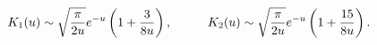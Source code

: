 \begin{equation}
\label{rev8}
K_1(u) \sim \sqrt{\frac{\pi}{2 u}} e^{-u} 
            \left( 1 + \frac{3}{8 u} \right),
\hspace{1.0cm}
K_2(u) \sim \sqrt{\frac{\pi}{2 u}} e^{-u}
            \left( 1 + \frac{15}{8 u} \right).
\end{equation}

